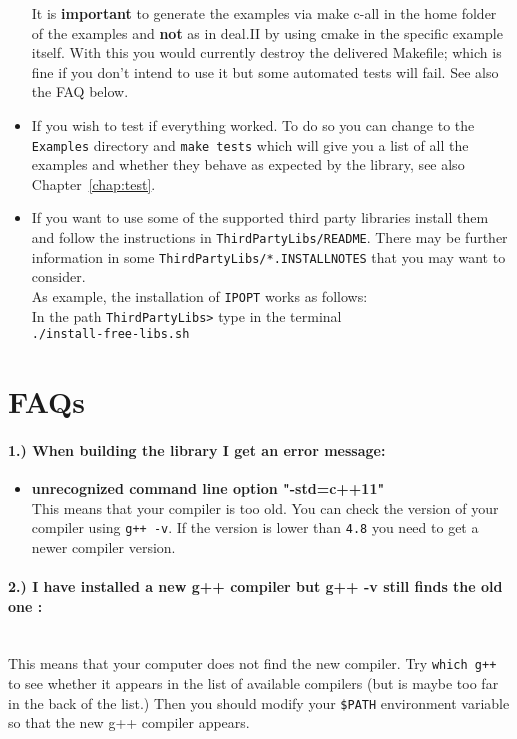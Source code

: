 \begin{itemize}
It is \textbf{important} to generate the examples via make c-all 
in the home folder of the examples and \textbf{not} as in deal.II by 
using cmake in the specific example itself. With this you
would currently destroy the delivered Makefile; which is fine if you
don't intend to use it but some automated tests will fail. See also the FAQ below.

\item If you wish to test if everything worked. To do so you can 
change to the \texttt{Examples} directory and \texttt{make tests} which will give you a 
list of all the examples and whether they behave as expected by the library, see also 
Chapter~\ref{chap:test}.
\item  If you want to use some of the supported third party libraries install them and follow 
 the instructions in \texttt{ThirdPartyLibs/README}. There may be further information 
 in some \texttt{ThirdPartyLibs/*.INSTALLNOTES} that you may want to
 consider.\\[3mm]
 As example, the installation of \texttt{IPOPT} works as follows:\\
In the path \texttt{ThirdPartyLibs>} type in the terminal\\
\texttt{./install-free-libs.sh}


\end{itemize}
\section{FAQs}
\label{sec_FAQ}
\paragraph{1.) When building the library I get an error message:}
\begin{itemize}
\item \textbf{unrecognized command line option "-std=c++11"}\\
  This means that your compiler is too old. You can check the 
  version of your compiler using \texttt{g++ -v}. If the version is lower than
  \texttt{4.8} you need to get a newer compiler version.
\end{itemize}

\paragraph{2.) I have installed a new g++ compiler but g++ -v still finds the old one :}
\ \\
  This means that your computer does not find the new compiler. Try
  \texttt{which g++} to see whether it appears in the list of available 
  compilers (but is maybe too far in the back of the list.) Then you should 
  modify your \texttt{\$PATH} environment variable so that the new g++ compiler
  appears.

